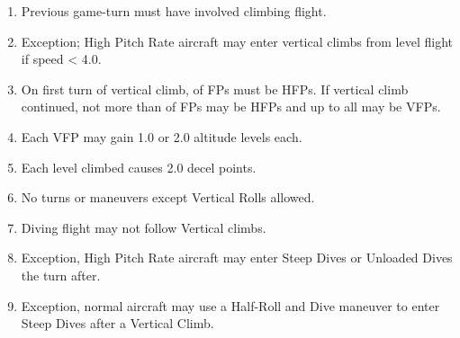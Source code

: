 \begin{table*}
\begin{multicols}{2}
\begin{enumerate}[nosep]
    \item Previous game-turn must have involved climbing flight.
    \item Exception; High Pitch Rate aircraft may enter vertical climbs from level flight if speed < 4.0.
    \item On first turn of vertical climb, {\onethird} of FPs must be HFPs. If vertical climb continued, not more than {\onethird} of FPs may be HFPs and up to all may be VFPs.
    \item Each VFP may gain 1.0 or 2.0 altitude levels each.
    \item Each level climbed causes 2.0 decel points.
    \item No turns or maneuvers except Vertical Rolls allowed.
    \item Diving flight may not follow Vertical climbs.
    \item Exception, High Pitch Rate aircraft may enter Steep Dives or Unloaded Dives the turn after.
    \item Exception, normal aircraft may use a Half-Roll and Dive maneuver to enter Steep Dives after a Vertical Climb.
\end{enumerate}


\end{multicols}

\end{table*}

